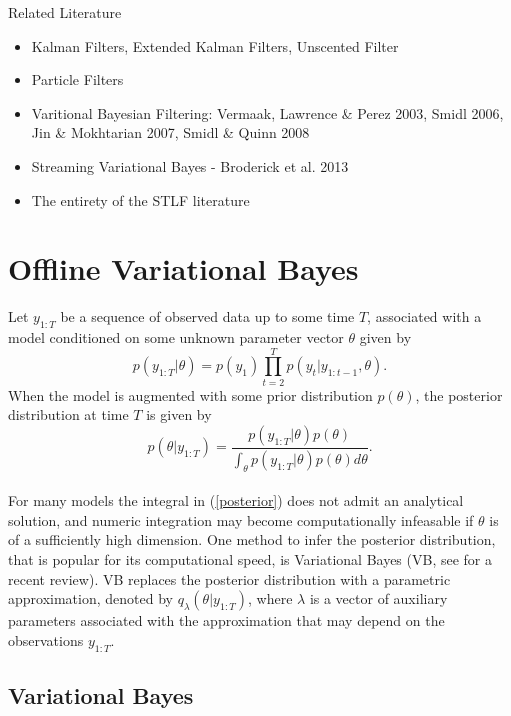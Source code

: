 \documentclass[12pt,a4paper]{article}\usepackage[]{graphicx}\usepackage[]{color}
\begin{document}
Related Literature
\begin{itemize}
\item Kalman Filters, Extended Kalman Filters, Unscented Filter
\item Particle Filters
\item Varitional Bayesian Filtering: Vermaak, Lawrence \& Perez 2003, Smidl 2006, Jin \& Mokhtarian 2007, Smidl \& Quinn 2008
\item Streaming Variational Bayes - Broderick et al. 2013
\item The entirety of the STLF literature
\end{itemize}

\section{Offline Variational Bayes}
\label{sec:Inference}

Let $y_{1:T}$ be a sequence of observed data up to some time $T$, associated with a model conditioned on some unknown parameter vector $\theta$ given by
\begin{equation}
\label{likelihood}
p(y_{1:T} | \theta) = p(y_1) \prod_{t=2}^{T} p(y_t | y_{1:t-1}, \theta).
\end{equation}
When the model is augmented with some prior distribution $p(\theta)$, the posterior distribution at time $T$ is given by
\begin{equation}
\label{posterior}
p(\theta | y_{1:T}) = \frac{p(y_{1:T} | \theta)p(\theta)}{\int_{\theta}p(y_{1:T} | \theta)p(\theta)d\theta}.
\end{equation}
\\

For many models the integral in (\ref{posterior}) does not admit an analytical solution, and numeric integration may become computationally infeasable if $\theta$ is of a sufficiently high dimension. One method to infer the posterior distribution, that is popular for its computational speed, is Variational Bayes (VB, see \citet{Blei2017} for a recent review). VB replaces the posterior distribution with a parametric approximation, denoted by $q_{\lambda}(\theta |y_{1:T})$, where $\lambda$ is a vector of auxiliary parameters associated with the approximation that may depend on the observations $y_{1:T}$.

\subsection{Variational Bayes}
\label{subsec:VB}
\end{document}
